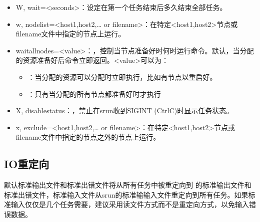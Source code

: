 \documentclass[a4paper,12pt,english]{sphinxmanual}
\begin{document}
\begin{itemize}
\item {} 
\sphinxAtStartPar
\sphinxhyphen{}W, \sphinxhyphen{}\sphinxhyphen{}wait=<seconds>：设定在第一个任务结束后多久结束全部任务。

\item {} 
\sphinxAtStartPar
\sphinxhyphen{}w, \sphinxhyphen{}\sphinxhyphen{}nodelist=<host1,host2,… or filename>：在特定<host1,host2>节点或filename文件中指定的节点上运行。

\item {} 
\sphinxAtStartPar
\sphinxhyphen{}\sphinxhyphen{}wait\sphinxhyphen{}all\sphinxhyphen{}nodes=<value>：，控制当节点准备好时何时运行命令。默认，当分配的资源准备好后命令立即返回。<value>可以为：
\begin{itemize}
\item {} 
：当分配的资源可以分配时立即执行，比如有节点以重启好。

\item {} 
：只有当分配的所有节点都准备好时才执行

\end{itemize}

\item {} 
\sphinxAtStartPar
\sphinxhyphen{}X, \sphinxhyphen{}\sphinxhyphen{}disable\sphinxhyphen{}status：，禁止在srun收到SIGINT (Ctrl\sphinxhyphen{}C)时显示任务状态。

\item {} 
\sphinxAtStartPar
\sphinxhyphen{}x, \sphinxhyphen{}\sphinxhyphen{}exclude=<host1,host2,… or filename>：在特定<host1,host2>节点或filename文件中指定的节点之外的节点上运行。

\end{itemize}


\subsection{IO重定向}
\label{\detokenize{slurm/slurm:io}}\label{\detokenize{slurm/slurm:slurmio}}
\sphinxAtStartPar
默认标准输出文件和标准出错文件将从所有任务中被重定向到 的标准输出文件和标准出错文件，标准输入文件从srun的标准输输入文件重定向到所有任务。如果标准输入仅仅是几个任务需要，建议采用读文件方式而不是重定向方式，以免输入错误数据。
\end{document}
